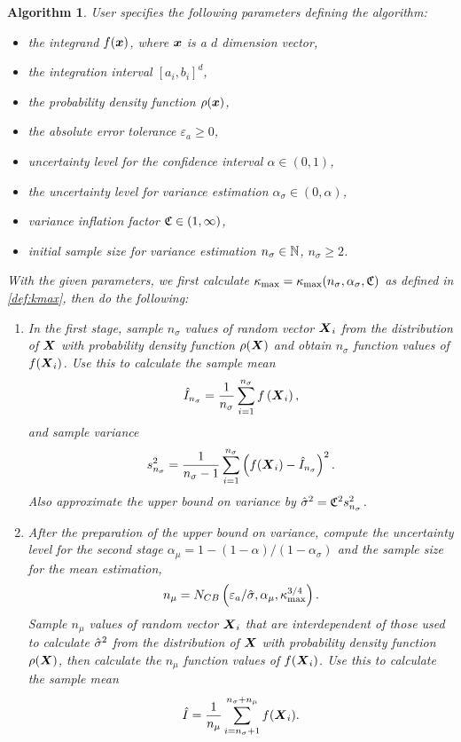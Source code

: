\documentclass{iitthesis}
\newtheorem{algorithm}[theorem]{Algorithm}
\begin{document}
\begin{algorithm}\label{alg:cubMCabsg} 
User specifies the following parameters defining the algorithm:
\begin{itemize}
\item the integrand $f(\boldsymbol{x})$, where $\boldsymbol{x}$ is a $d$ dimension vector,
\item the integration interval $[a_i,b_i]^d$,
\item the probability density function $\rho(\boldsymbol{x})$,
\item the absolute error tolerance $\varepsilon_a \geq 0$,
\item uncertainty level for the confidence interval $\alpha\in (0,1)$,
\item the uncertainty level for variance estimation $\alpha_\sigma \in (0,\alpha)$,
\item variance inflation factor $\mathfrak{C} \in (1,\infty)$, 
\item initial sample size for variance estimation $n_{\sigma} \in \mathbb{N}$, $n_{\sigma} \geq 2$.
\end{itemize} 
With the given parameters, we first calculate $\kappa_{\max}=\kappa_{\max}(n_\sigma,\alpha_\sigma,\mathfrak{C})$ as defined in \eqref{def:kmax}, then do the following:
\begin{enumerate}
\item In the first stage, sample $n_\sigma$ values of random vector $\boldsymbol{X}_i$ from the distribution of $\boldsymbol{X}$ with probability density function $\rho(\boldsymbol{X})$ and obtain $n_\sigma$ function values of $f(\boldsymbol{X}_i)$. Use this to calculate the sample mean $$\hat{I}_{n_\sigma} = \frac{1}{n_\sigma}\sum_{i=1}^{n_\sigma} f\left(\boldsymbol{X}_i\right),$$ and sample variance $$s_{n_\sigma}^2 = \frac{1}{n_\sigma-1}\sum_{i=1}^{n_\sigma} \left(f(\boldsymbol{X}_i)-\hat{I}_{n_\sigma}\right)^2.$$ Also approximate the upper bound on variance by $\hat{\sigma}^2 = \mathfrak{C}^2 s^2_{n_\sigma}$. 

\item After the preparation of the upper bound on variance, compute the uncertainty level for the second stage $\alpha_\mu = 1-(1-\alpha)/(1-\alpha_{\sigma})$ and the sample size for the mean estimation,
\begin{align}\label{NCBmeanMCabs}
n_\mu = N_{CB} \left(\varepsilon_a/\hat{\sigma},\alpha_\mu, \kappa_{\max}^{3/4}\right).
\end{align}
Sample $n_\mu$ values of random vector $\boldsymbol{X}_i$ that are interdependent of those used to calculate $\hat{\sigma}^2$ from the distribution of $\boldsymbol{X}$ with probability density function $\rho(\boldsymbol{X})$, then calculate the $n_\mu$ function values of $f(\boldsymbol{X}_i)$. Use this to calculate the sample mean 
\begin{align}\label{hmun}
\hat{I}= \frac{1}{n_\mu}\sum_{i = n_\sigma+1}^{n_\sigma+n_\mu}f(\boldsymbol{X}_i).
\end{align}
\end{enumerate}
\end{algorithm}
\end{document}

